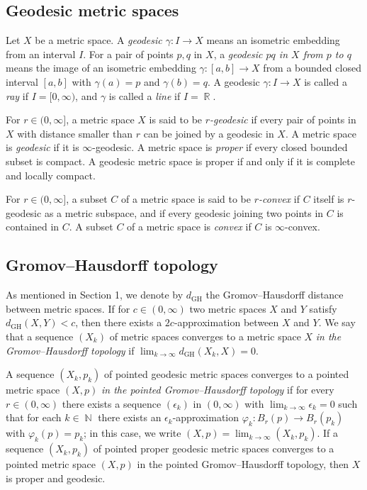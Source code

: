 \documentclass[a4paper,12pt]{amsart}
\newcommand{\R}{\operatorname{\mathbb{R}}}
\newcommand{\N}{\operatorname{\mathbb{N}}}
\newcommand{\GH}{\operatorname{\mathrm{GH}}}
\numberwithin{equation}{section}
\theoremstyle{plain}
\theoremstyle{definition}
\theoremstyle{remark}
\begin{document}
\subsection{Geodesic metric spaces}

Let $X$ be a metric space.
A \emph{geodesic $\gamma \colon I \to X$} 
means an isometric embedding from an interval $I$.
For a pair of points $p, q$ in $X$,
a \emph{geodesic $pq$ in $X$ from $p$ to $q$}
means the image of an isometric embedding
$\gamma \colon [a,b] \to X$
from a bounded closed interval $[a,b]$
with $\gamma(a) = p$ and $\gamma(b) = q$.
A geodesic $\gamma \colon I \to X$ is called 
a \emph{ray} 
if $I = [0,\infty)$,
and $\gamma$ is called a \emph{line} if $I = \R$.

For $r \in (0,\infty]$,
a metric space $X$ is said to be
\emph{$r$-geodesic}
if every pair of points in $X$ with distance smaller than $r$
can be joined by a geodesic in $X$.
A metric space is 
\emph{geodesic}
if it is $\infty$-geodesic.
A metric space is 
\emph{proper}
if every closed bounded subset is compact.
A geodesic metric space is proper
if and only if
it is complete and locally compact.

For $r \in (0,\infty]$,
a subset $C$ of a metric space is said to be 
\emph{$r$-convex}
if $C$ itself is $r$-geodesic as a metric subspace, 
and if every geodesic joining two points in $C$
is contained in $C$.
A subset $C$ of a metric space is 
\emph{convex}
if $C$ is $\infty$-convex.

\subsection{Gromov--Hausdorff topology}

As mentioned in Section 1,
we denote by $d_{\GH}$ the Gromov--Hausdorff distance 
between metric spaces.
If for $c \in (0,\infty)$ two metric spaces $X$ and $Y$
satisfy $d_{\GH}(X,Y) < c$,
then there exists a $2c$-approximation between $X$ and $Y$.
We say that a sequence $(X_k)$ of metric spaces 
converges to a metric space $X$ 
\emph{in the Gromov--Hausdorff topology}
if $\lim_{k \to \infty} d_{\GH}(X_k,X) = 0$.

A sequence $(X_k,p_k)$ of pointed geodesic metric spaces 
converges to a pointed metric space $(X,p)$
\emph{in the pointed Gromov--Hausdorff topology}
if for every $r \in (0,\infty)$
there exists a sequence $(\epsilon_k)$ in $(0,\infty)$
with $\lim_{k \to \infty}\epsilon_k = 0$
such that for each $k \in \N$
there exists an
$\epsilon_k$-approximation $\varphi_k \colon B_r(p) \to B_r(p_k)$
with $\varphi_k(p) = p_k$;
in this case,
we write $(X,p) = \lim_{k \to \infty} (X_k,p_k)$.
If a sequence $(X_k,p_k)$ of pointed proper geodesic metric spaces 
converges to a pointed metric space $(X,p)$
in the pointed Gromov--Hausdorff topology,
then $X$ is proper and geodesic.
\end{document}

